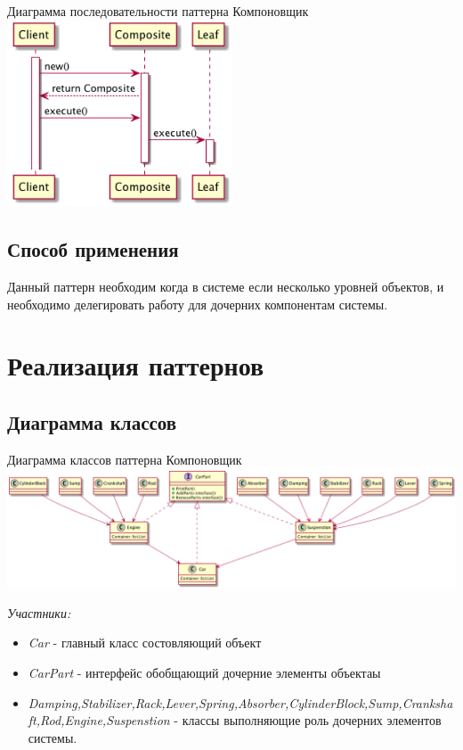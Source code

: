 \documentclass[PI,LAB]{HSEUniversity}
\begin{document}
\begin{FIGURE}[h]{Диаграмма последовательности паттерна Компоновщик\label{fig:example-figure}}
    \includegraphics[width=0.5\textwidth]{../out/diagrams/default/compactors}
\end{FIGURE}
\section{Способ применения}
Данный паттерн необходим когда в системе если несколько уровней объектов, и необходимо делегировать  работу для дочерних компонентам системы.
\chapter{Реализация паттернов}

\section{Диаграмма классов}
\begin{FIGURE}[h]{Диаграмма классов паттерна Компоновщик\label{fig:example-figure}}
    \includegraphics[width=\textwidth]{../out/diagrams/builder/compactor}
\end{FIGURE}
\emph{Участники:}
\begin{itemize}
    \item \emph{Car} - главный класс состовляющий объект
    \item \emph{CarPart} - интерфейс обобщающий дочерние элементы объектаы
    \item \emph{Damping,Stabilizer,Rack,Lever,Spring,Absorber,CylinderBlock,Sump,Crankshaft,Rod,Engine,Suspenstion} - классы выполняющие роль дочерних элементов системы.
\end{itemize}
\pagebreak
\end{document}
